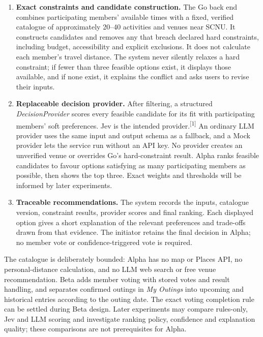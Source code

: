\documentclass[12pt,a4paper]{article}
\begin{document}
\begin{enumerate}
  \item \textbf{Exact constraints and candidate construction.} The Go back end combines participating members' available times with a fixed, verified catalogue of approximately 20--40 activities and venues near SCNU. It constructs candidates and removes any that breach declared hard constraints, including budget, accessibility and explicit exclusions. It does not calculate each member's travel distance. The system never silently relaxes a hard constraint; if fewer than three feasible options exist, it displays those available, and if none exist, it explains the conflict and asks users to revise their inputs.
  \item \textbf{Replaceable decision provider.} After filtering, a structured \emph{DecisionProvider} scores every feasible candidate for its fit with participating members' soft preferences. Jev is the intended provider.\textsuperscript{[1]} An ordinary LLM provider uses the same input and output schema as a fallback, and a Mock provider lets the service run without an API key. No provider creates an unverified venue or overrides Go's hard-constraint result. Alpha ranks feasible candidates to favour options satisfying as many participating members as possible, then shows the top three. Exact weights and thresholds will be informed by later experiments.
  \item \textbf{Traceable recommendations.} The system records the inputs, catalogue version, constraint results, provider scores and final ranking. Each displayed option gives a short explanation of the relevant preferences and trade-offs drawn from that evidence. The initiator retains the final decision in Alpha; no member vote or confidence-triggered vote is required.
\end{enumerate}

The catalogue is deliberately bounded: Alpha has no map or Places API, no personal-distance calculation, and no LLM web search or free venue recommendation. Beta adds member voting with stored votes and result handling, and separates confirmed outings in \emph{My Outings} into upcoming and historical entries according to the outing date. The exact voting completion rule can be settled during Beta design. Later experiments may compare rules-only, Jev and LLM scoring and investigate ranking policy, confidence and explanation quality; these comparisons are not prerequisites for Alpha.
\end{document}
